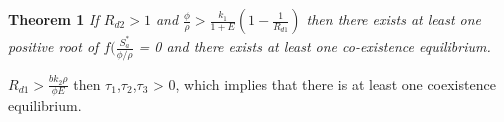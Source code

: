 \documentclass[a4paper]{article}
\begin{document}
\textbf{Theorem 1} \textit{If $R_{d2} > 1$ and $\frac{\phi}{\rho} > \frac{k_1}{1+E}\left(1 - \frac{1}{R_{d1}}\right)$ then there exists at least one positive root of $f(\frac{S_a^*}{\phi/\rho}$ = 0 and there exists at least one co-existence equilibrium.}

$R_{d1} > \displaystyle\frac{bk_2\rho}{\phi E}$ then $\tau_1$,$\tau_2$,$\tau_3$ > 0, which implies that there is at least one coexistence equilibrium. 

\end{document}

